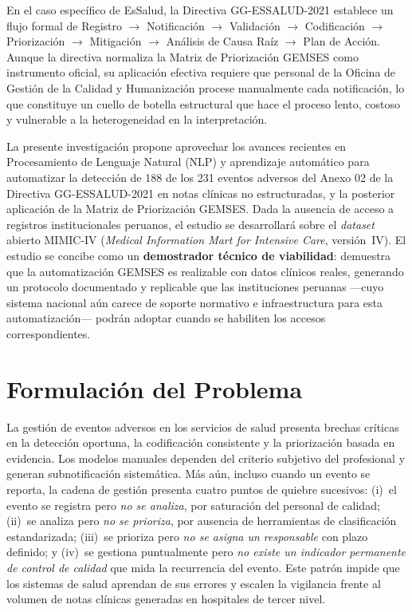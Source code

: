 En el caso específico de EsSalud, la Directiva GG-ESSALUD-2021 establece un flujo formal de Registro $\rightarrow$ Notificación $\rightarrow$ Validación $\rightarrow$ Codificación $\rightarrow$ Priorización $\rightarrow$ Mitigación $\rightarrow$ Análisis de Causa Raíz $\rightarrow$ Plan de Acción. Aunque la directiva normaliza la Matriz de Priorización GEMSES como instrumento oficial, su aplicación efectiva requiere que personal de la Oficina de Gestión de la Calidad y Humanización procese manualmente cada notificación, lo que constituye un cuello de botella estructural que hace el proceso lento, costoso y vulnerable a la heterogeneidad en la interpretación.

La presente investigación propone aprovechar los avances recientes en Procesamiento de Lenguaje Natural (NLP) y aprendizaje automático para automatizar la detección de 188 de los 231 eventos adversos del Anexo 02 de la Directiva GG-ESSALUD-2021 en notas clínicas no estructuradas, y la posterior aplicación de la Matriz de Priorización GEMSES. Dada la ausencia de acceso a registros institucionales peruanos, el estudio se desarrollará sobre el \textit{dataset} abierto MIMIC-IV (\textit{Medical Information Mart for Intensive Care}, versión~IV). El estudio se concibe como un \textbf{demostrador técnico de viabilidad}: demuestra que la automatización GEMSES es realizable con datos clínicos reales, generando un protocolo documentado y replicable que las instituciones peruanas ---cuyo sistema nacional aún carece de soporte normativo e infraestructura para esta automatización--- podrán adoptar cuando se habiliten los accesos correspondientes.

\section{Formulación del Problema}
\label{sec:formulacion}

La gestión de eventos adversos en los servicios de salud presenta brechas críticas en la detección oportuna, la codificación consistente y la priorización basada en evidencia. Los modelos manuales dependen del criterio subjetivo del profesional y generan subnotificación sistemática. Más aún, incluso cuando un evento se reporta, la cadena de gestión presenta cuatro puntos de quiebre sucesivos: (i)~el evento se registra pero \textit{no se analiza}, por saturación del personal de calidad; (ii)~se analiza pero \textit{no se prioriza}, por ausencia de herramientas de clasificación estandarizada; (iii)~se prioriza pero \textit{no se asigna un responsable} con plazo definido; y (iv)~se gestiona puntualmente pero \textit{no existe un indicador permanente de control de calidad} que mida la recurrencia del evento. Este patrón impide que los sistemas de salud aprendan de sus errores y escalen la vigilancia frente al volumen de notas clínicas generadas en hospitales de tercer nivel.

